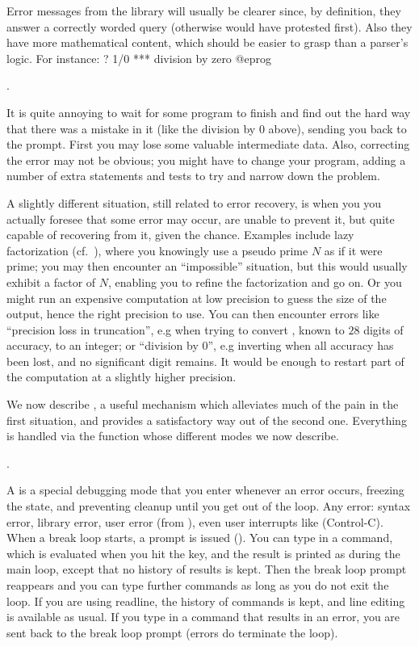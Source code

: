 Error messages from the library will usually be clearer since, by
definition, they answer a correctly worded query (otherwise  would have
protested first). Also they have more mathematical content, which should be
easier to grasp than a parser's logic. For instance:
\bprog
? 1/0
  ***   division by zero
@eprog

.\label{se:errorrec}

It is quite annoying to wait for some program to finish and find out the hard
way that there was a mistake in it (like the division by 0 above), sending
you back to the prompt. First you may lose some valuable intermediate data.
Also, correcting the error may not be obvious; you might have to change your
program, adding a number of extra statements and tests to try and narrow down
the problem.

A slightly different situation, still related to error recovery, is when you
you actually foresee that some error may occur, are unable to prevent it, but
quite capable of recovering from it, given the chance. Examples include lazy
factorization (cf.~), where you knowingly use a pseudo prime
$N$ as if it were prime; you may then encounter an ``impossible'' situation,
but this would usually exhibit a factor of $N$, enabling you to refine the
factorization and go on. Or you might run an expensive computation at low
precision to guess the size of the output, hence the right precision to use.
You can then encounter errors like ``precision loss in truncation'', e.g when
trying to convert , known to $28$ digits of accuracy, to an
integer; or ``division by 0'', e.g inverting  when all accuracy
has been lost, and no significant digit remains. It would be enough to
restart part of the computation at a slightly higher precision.

We now describe , a useful mechanism which alleviates
much of the pain in the first situation, and provides a satisfactory way out
of the second one. Everything is handled via the  function whose
different modes we now describe.

.\label{se:breakloop}

A  is a special debugging mode that you enter whenever an
error occurs, freezing the  state, and preventing cleanup until you get out
of the loop. Any error: syntax error, library error, user error (from
), even user interrupts like  (Control-C). When a break
loop starts, a prompt is issued (). You can type in a  command,
which is evaluated when you hit the  key, and the result is
printed as during the main  loop, except that no history of results
is kept.
Then the break loop prompt reappears and you can type further commands as
long as you do not exit the loop. If you are using readline, the history of
commands is kept, and line editing is available as usual. If you type in a
command that results in an error, you are sent back to the break loop prompt
(errors do  terminate the loop).


